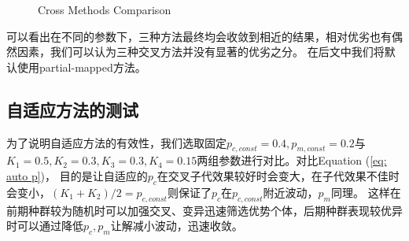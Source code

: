\documentclass[12pt]{article}
\begin{document}
\begin{figure}[H]
    \centering
    \caption{Cross Methods Comparison}
\end{figure}

可以看出在不同的参数下，三种方法最终均会收敛到相近的结果，相对优劣也有偶然因素，我们可以认为三种交叉方法并没有显著的优劣之分。
在后文中我们将默认使用partial-mapped方法。

\subsection{自适应方法的测试}
为了说明自适应方法的有效性，我们选取固定$p_{c,const}=0.4,p_{m,const}=0.2$与$K_1 = 0.5, K_2 = 0.3, K_3 = 0.3, K_4 = 0.15$两组参数进行对比。对比Equation (\ref{eq: auto p})，
目的是让自适应的$p_c$在交叉子代效果较好时会变大，在子代效果不佳时会变小，$(K_1 + K_2)/2 = p_{c,const}$则保证了$p_c$在$p_{c,const}$附近波动，$p_m$同理。
这样在前期种群较为随机时可以加强交叉、变异迅速筛选优势个体，后期种群表现较优异时可以通过降低$p_c,p_m$让解减小波动，迅速收敛。
\end{document}
